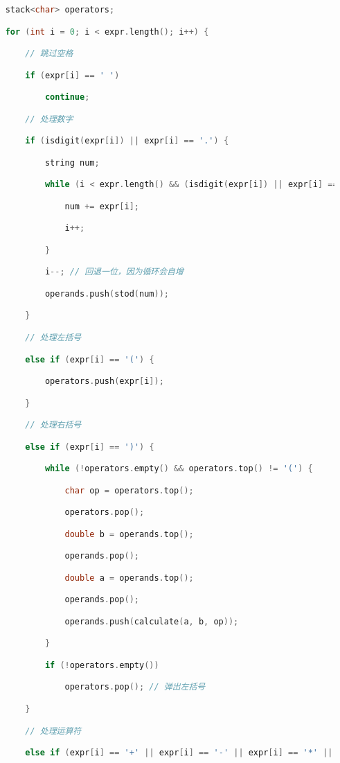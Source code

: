 \begin{lstlisting}[language=C++]
    stack<char> operators;

    for (int i = 0; i < expr.length(); i++) {

        // 跳过空格

        if (expr[i] == ' ')

            continue;

        // 处理数字

        if (isdigit(expr[i]) || expr[i] == '.') {

            string num;

            while (i < expr.length() && (isdigit(expr[i]) || expr[i] == '.')) {

                num += expr[i];

                i++;

            }

            i--; // 回退一位，因为循环会自增

            operands.push(stod(num));

        }

        // 处理左括号

        else if (expr[i] == '(') {

            operators.push(expr[i]);

        }

        // 处理右括号

        else if (expr[i] == ')') {

            while (!operators.empty() && operators.top() != '(') {

                char op = operators.top();

                operators.pop();

                double b = operands.top();

                operands.pop();

                double a = operands.top();

                operands.pop();

                operands.push(calculate(a, b, op));

            }

            if (!operators.empty())

                operators.pop(); // 弹出左括号

        }

        // 处理运算符

        else if (expr[i] == '+' || expr[i] == '-' || expr[i] == '*' || expr[i] == '/' || expr[i] == '^') {


\end{lstlisting}
